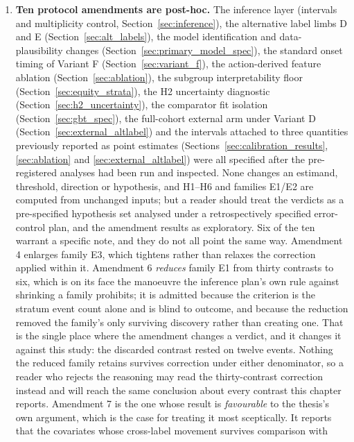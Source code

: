 \begin{enumerate}
    \item \textbf{Ten protocol amendments are post-hoc.} The inference layer
    (intervals and multiplicity control, Section~\ref{sec:inference}), the
    alternative label limbs D and E (Section~\ref{sec:alt_labels}), the model
    identification and data-plausibility changes
    (Section~\ref{sec:primary_model_spec}), the standard onset timing of
    Variant F (Section~\ref{sec:variant_f}), the action-derived feature
    ablation (Section~\ref{sec:ablation}), the subgroup interpretability
    floor (Section~\ref{sec:equity_strata}), the H2 uncertainty diagnostic
    (Section~\ref{sec:h2_uncertainty}), the comparator fit isolation
    (Section~\ref{sec:gbt_spec}), the full-cohort external arm under Variant D
    (Section~\ref{sec:external_altlabel}) and the intervals attached to three
    quantities previously reported as point estimates
    (Sections~\ref{sec:calibration_results}, \ref{sec:ablation} and
    \ref{sec:external_altlabel}) were all specified after the
    pre-registered analyses had been run and inspected. None changes an
    estimand, threshold, direction or hypothesis, and H1--H6 and families E1/E2
    are computed from unchanged inputs; but a reader should treat the verdicts
    as a pre-specified hypothesis set analysed under a retrospectively specified
    error-control plan, and the amendment results as exploratory. Six of the
    ten warrant a specific note, and they do not all point the same way.
    Amendment 4 enlarges family E3, which tightens rather than relaxes the
    correction applied within it.
    Amendment 6 \emph{reduces} family E1 from thirty contrasts to six, which is
    on its face the manoeuvre the inference plan's own rule against shrinking a
    family prohibits; it is admitted because the criterion is the stratum event
    count alone and is blind to outcome, and because the reduction removed the
    family's only surviving discovery rather than creating one. That is the
    single place where the amendment changes a verdict, and it changes it
    against this study: the discarded contrast rested on twelve events. Nothing
    the reduced family retains survives correction under either denominator, so
    a reader who rejects the reasoning may read the thirty-contrast correction
    instead and will reach the same conclusion about every contrast this
    chapter reports.
    Amendment 7 is the one whose result is \emph{favourable} to the thesis's own
    argument, which is the case for treating it most sceptically. It reports
    that the covariates whose cross-label movement survives comparison with

\end{enumerate}
